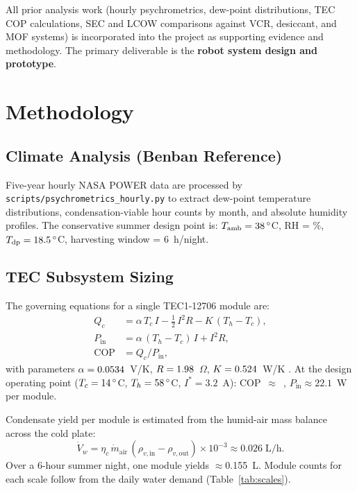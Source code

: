 \documentclass[11pt,a4paper]{article}
\begin{document}
All prior analysis work (hourly psychrometrics, dew-point distributions, TEC COP calculations,
SEC and LCOW comparisons against VCR, desiccant, and MOF systems) is incorporated into the
project as supporting evidence and methodology. The primary deliverable is the \textbf{robot
system design and prototype}.

\section{Methodology}

\subsection{Climate Analysis (Benban Reference)}

Five-year hourly NASA POWER data \cite{nasa_power} are processed by
\texttt{scripts/psychrometrics\_hourly.py} to extract dew-point temperature distributions,
condensation-viable hour counts by month, and absolute humidity profiles. The conservative
summer design point is: $T_{\mathrm{amb}} = 38\,^\circ$C, RH = \RHdesign\%,
$T_{\mathrm{dp}} = 18.5\,^\circ$C, harvesting window = 6~h/night.

\subsection{TEC Subsystem Sizing}

The governing equations for a single TEC1-12706 module are:
\begin{align}
  Q_c &= \alpha\,T_c\,I - \tfrac{1}{2}\,I^2 R - K\,(T_h - T_c), \label{eq:Qc} \\
  P_{\mathrm{in}} &= \alpha\,(T_h - T_c)\,I + I^2 R, \label{eq:Pin} \\
  \mathrm{COP} &= Q_c / P_{\mathrm{in}}, \label{eq:COP}
\end{align}
with parameters $\alpha = 0.0534$~V/K, $R = 1.98$~$\Omega$, $K = 0.524$~W/K
\cite{riffat2003peltier,eslami2021tec}. At the design operating point
($T_c = 14\,^\circ$C, $T_h = 58\,^\circ$C, $I^* = 3.2$~A):
COP~$\approx$~\TECCOPnom, $P_{\mathrm{in}} \approx 22.1$~W per module.

Condensate yield per module is estimated from the humid-air mass balance across the cold plate:
\begin{equation}
  \dot{V}_w = \eta_c \,\dot{m}_{\mathrm{air}}\,(\rho_{v,\mathrm{in}} - \rho_{v,\mathrm{out}})
  \times 10^{-3} \approx 0.026\;\text{L/h}. \label{eq:Vw}
\end{equation}
Over a 6-hour summer night, one module yields $\approx$0.155~L. Module counts for each scale
follow from the daily water demand (Table~\ref{tab:scales}).
\end{document}
